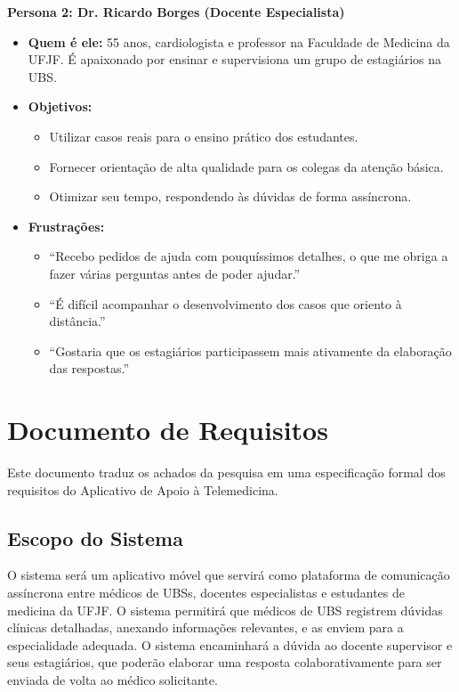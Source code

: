 \documentclass[12pt, a4paper, oneside]{abntex2}
\begin{document}
\textbf{Persona 2: Dr. Ricardo Borges (Docente Especialista)}
\begin{itemize}
    \item \textbf{Quem é ele:} 55 anos, cardiologista e professor na Faculdade de Medicina da UFJF. É apaixonado por ensinar e supervisiona um grupo de estagiários na UBS.
    \item \textbf{Objetivos:}
    \begin{itemize}
        \item Utilizar casos reais para o ensino prático dos estudantes.
        \item Fornecer orientação de alta qualidade para os colegas da atenção básica.
        \item Otimizar seu tempo, respondendo às dúvidas de forma assíncrona.
    \end{itemize}
    \item \textbf{Frustrações:}
    \begin{itemize}
        \item ``Recebo pedidos de ajuda com pouquíssimos detalhes, o que me obriga a fazer várias perguntas antes de poder ajudar.''
        \item ``É difícil acompanhar o desenvolvimento dos casos que oriento à distância.''
        \item ``Gostaria que os estagiários participassem mais ativamente da elaboração das respostas.''
    \end{itemize}
\end{itemize}

\chapter{Documento de Requisitos}

Este documento traduz os achados da pesquisa em uma especificação formal dos requisitos do Aplicativo de Apoio à Telemedicina.

\section{Escopo do Sistema}
\label{sec:escopo}
O sistema será um aplicativo móvel que servirá como plataforma de comunicação assíncrona entre médicos de UBSs, docentes especialistas e estudantes de medicina da UFJF. O sistema permitirá que médicos de UBS registrem dúvidas clínicas detalhadas, anexando informações relevantes, e as enviem para a especialidade adequada. O sistema encaminhará a dúvida ao docente supervisor e seus estagiários, que poderão elaborar uma resposta colaborativamente para ser enviada de volta ao médico solicitante.
\end{document}
